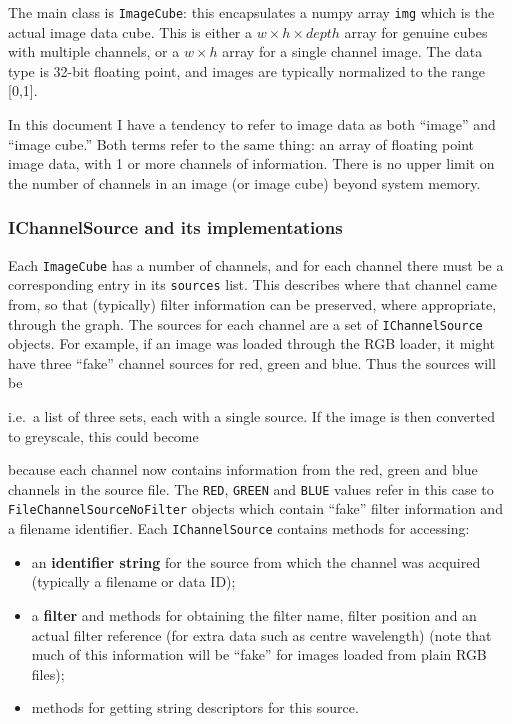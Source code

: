 The main class is \texttt{ImageCube}: this encapsulates a numpy array
\texttt{img}
which is the actual image data cube. This is either a 
$w \times h \times depth$ array for genuine cubes with multiple channels,
or a $w \times h$ array for a single channel image. The data type is 32-bit floating
point, and images are typically normalized to the range [0,1].

\begin{notebox}
In this document I have a tendency to refer to image data as both ``image'' and ``image cube.''
Both terms refer to the same thing: an array of floating point image data, with 1 or more channels
of information. There is no upper limit on the number of channels in an image (or image cube)
beyond system memory.
\end{notebox}


\subsubsection{IChannelSource and its implementations}
Each \texttt{ImageCube} has a number of channels, and for each channel there must be a corresponding
entry in its \texttt{sources} list. This describes where that channel came from, so that (typically) filter
information can be preserved, where appropriate, through the graph. The sources for each channel are a set
of \texttt{IChannelSource} objects. For example, if an image was loaded through the RGB loader, it might
have three ``fake'' channel sources for red, green and blue. Thus the sources will be 
\begin{v}
\end{v}
i.e.\ a list of three sets, each with a single source.
If the image is then converted to greyscale, this could
become
\begin{v}
\end{v}
because each channel now contains information from the red, green and blue channels in the source file.
The \texttt{RED}, \texttt{GREEN} and \texttt{BLUE} values refer in this case to \texttt{FileChannelSourceNoFilter} objects
which contain ``fake'' filter information and a filename identifier.
Each \texttt{IChannelSource} contains methods for accessing:
\begin{itemize}
\item an \textbf{identifier string} for the source from which the channel was acquired (typically a filename or data ID);
\item a \textbf{filter} and methods for obtaining the filter name, filter position and an actual filter reference (for extra data such as centre wavelength) (note
that much of this information will be ``fake'' for images loaded from plain RGB files);
\item methods for getting string descriptors for this source.
\end{itemize}

